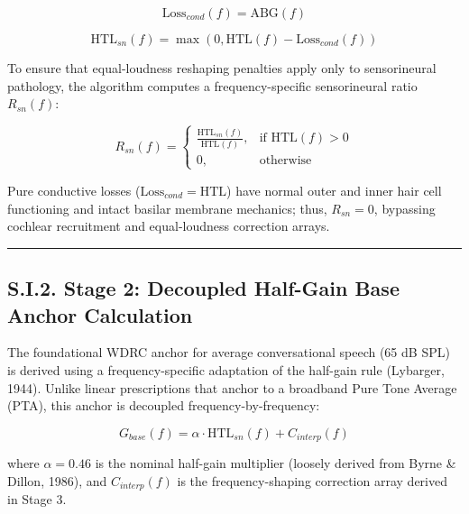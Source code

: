 \documentclass[
  12pt,
]{article}
\begin{document}
\begin{equation}
\text{Loss}_{cond}(f) = \text{ABG}(f)
\end{equation}

\begin{equation}
\text{HTL}_{sn}(f) = \max\left(0, \text{HTL}(f) - \text{Loss}_{cond}(f)\right)
\end{equation}

To ensure that equal-loudness reshaping penalties apply only to
sensorineural pathology, the algorithm computes a frequency-specific
sensorineural ratio \(R_{sn}(f)\):

\begin{equation}
R_{sn}(f) = \begin{cases} 
\frac{\text{HTL}_{sn}(f)}{\text{HTL}(f)}, & \text{if } \text{HTL}(f) > 0 \\ 
0, & \text{otherwise} 
\end{cases}
\end{equation}

Pure conductive losses (\(\text{Loss}_{cond} = \text{HTL}\)) have normal
outer and inner hair cell functioning and intact basilar membrane
mechanics; thus, \(R_{sn} = 0\), bypassing cochlear recruitment and
equal-loudness correction arrays.

\begin{center}\rule{0.5\linewidth}{0.5pt}\end{center}

\subsection{S.I.2. Stage 2: Decoupled Half-Gain Base Anchor
Calculation}\label{s.i.2.-stage-2-decoupled-half-gain-base-anchor-calculation}

The foundational WDRC anchor for average conversational speech (65 dB
SPL) is derived using a frequency-specific adaptation of the half-gain
rule (Lybarger, 1944). Unlike linear prescriptions that anchor to a
broadband Pure Tone Average (PTA), this anchor is decoupled
frequency-by-frequency:

\begin{equation}
G_{base}(f) = \alpha \cdot \text{HTL}_{sn}(f) + C_{interp}(f)
\end{equation}

where \(\alpha = 0.46\) is the nominal half-gain multiplier (loosely
derived from Byrne \& Dillon, 1986), and \(C_{interp}(f)\) is the
frequency-shaping correction array derived in Stage 3.
\end{document}
